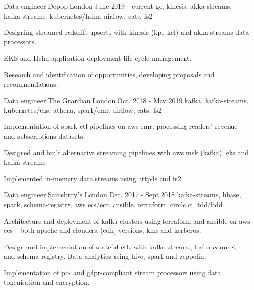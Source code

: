 \begin{cventries}
  \cventry
    {Data engineer} %
    {\hspace{0.25em}Depop} %
    {London} %
    {June 2019 - current} %
    {go, kinesis, akka-streams, kafka-streams, kubernetes/helm, airflow, cats, fs2} %
    {
      \begin{cvitems} %
        \item {Designing streamed redshift upserts with kinesis (kpl, kcl) and akka-streams data processors.}
        \item {EKS and Helm application deployment life-cycle management.}
        \item {Research and identification of opportunities, developing proposals and recommendations.}
      \end{cvitems}
    }

  \cventry
    {Data engineer} %
    {\hspace{0.5em}The Guardian} %
    {London} %
    {Oct. 2018 - May 2019} %
    {kafka, kafka-streams, kubernetes/eks, athena, spark/emr, airflow, cats, fs2} %
    {
      \begin{cvitems} %
        \item {Implementation of spark etl pipelines on aws emr, processing readers' revenue and subscriptions datasets.}
        \item {Designed and built alternative streaming pipelines with aws msk (kafka), eks and kafka-streams.}
        \item {Implemented in-memory data streams using http4s and fs2.}
      \end{cvitems}
    }

  \cventry
    {Data engineer} %
    {\hspace{0.5em}Sainsbury's} %
    {London} %
    {Dec. 2017 - Sept 2018} %
    {kafka-streams, hbase, spark, schema-registry, aws ecs/ecr, ansible, terraform, circle ci, tdd/bdd} %
    {
      \begin{cvitems} %
        \item {Architecture and deployment of kafka clusters using terraform and ansible on aws ecs -- both apache and cloudera (cdh) versions, kms and kerberos.}
        \item {Design and implementation of stateful etls with kafka-streams, kafka-connect, and schema-registry. Data analytics using hive, spark and zeppelin.}
        \item {Implementation of pii- and gdpr-compliant stream processors using data tokenisation and encryption.}
      \end{cvitems}
    }


\end{cventries}
